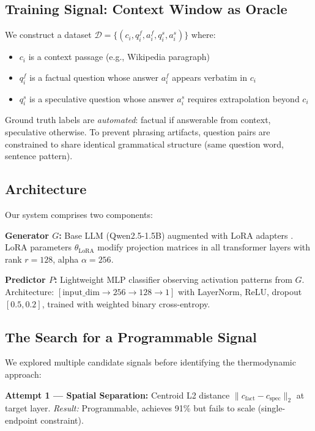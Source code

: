 \documentclass[11pt,a4paper]{article}
\begin{document}
\subsection{Training Signal: Context Window as Oracle}

We construct a dataset $\mathcal{D} = \{(c_i, q_i^f, a_i^f, q_i^s, a_i^s)\}$ where:
\begin{itemize}
\item $c_i$ is a context passage (e.g., Wikipedia paragraph)
\item $q_i^f$ is a factual question whose answer $a_i^f$ appears verbatim in $c_i$
\item $q_i^s$ is a speculative question whose answer $a_i^s$ requires extrapolation beyond $c_i$
\end{itemize}

Ground truth labels are \emph{automated}: factual if answerable from context, speculative otherwise. To prevent phrasing artifacts, question pairs are constrained to share identical grammatical structure (same question word, sentence pattern).

\subsection{Architecture}

Our system comprises two components:

\textbf{Generator $G$:} Base LLM (Qwen2.5-1.5B) augmented with LoRA adapters \citep{hu2021lora}. LoRA parameters $\theta_\text{LoRA}$ modify projection matrices in all transformer layers with rank $r=128$, alpha $\alpha=256$.

\textbf{Predictor $P$:} Lightweight MLP classifier observing activation patterns from $G$. Architecture: $[\text{input\_dim} \rightarrow 256 \rightarrow 128 \rightarrow 1]$ with LayerNorm, ReLU, dropout $[0.5, 0.2]$, trained with weighted binary cross-entropy.

\subsection{The Search for a Programmable Signal}

We explored multiple candidate signals before identifying the thermodynamic approach:

\textbf{Attempt 1 --- Spatial Separation:} Centroid L2 distance $\|c_\text{fact} - c_\text{spec}\|_2$ at target layer. \emph{Result:} Programmable, achieves 91\% but fails to scale (single-endpoint constraint).
\end{document}
